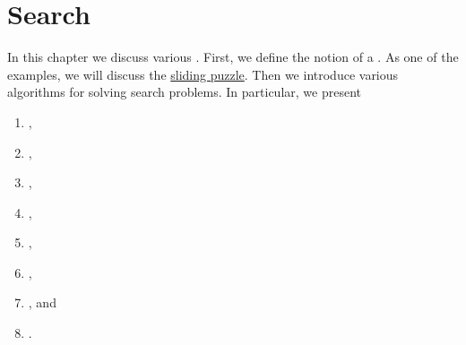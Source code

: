 \chapter{Search}
In this chapter we discuss various .  First, we define
the notion of a .  As one of the examples, we will discuss the
\href{https://en.wikipedia.org/wiki/15_puzzle}{sliding puzzle}.  Then we 
introduce various algorithms for solving search problems.  In particular, we present
\begin{enumerate}
\item {},
\item {},
\item {},
\item {},
\item {}, 
\item {},
\item {}, and
\item {}.
\end{enumerate}

